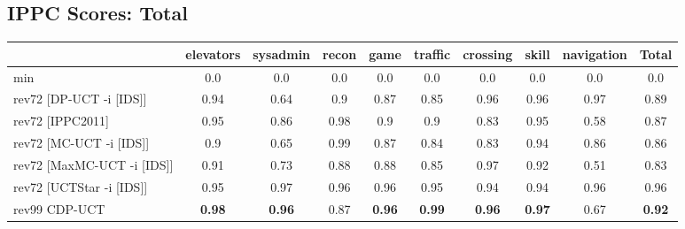 \documentclass{article}
\begin{document}
\bigskip

\subsection*{IPPC Scores: Total}

\begin{tabular}{|l|r@{$\pm$}rr@{$\pm$}rr@{$\pm$}rr@{$\pm$}rr@{$\pm$}rr@{$\pm$}rr@{$\pm$}rr@{$\pm$}rr@{$\pm$}r|}
\hline

& \multicolumn{2}{c}{elevators}
& \multicolumn{2}{c}{sysadmin}
& \multicolumn{2}{c}{recon}
& \multicolumn{2}{c}{game}
& \multicolumn{2}{c}{traffic}
& \multicolumn{2}{c}{crossing}
& \multicolumn{2}{c}{skill}
& \multicolumn{2}{c}{navigation}
& \multicolumn{2}{c|}{Total}
\\
\hline
\hline
min
& \multicolumn{2}{c}{0.0}
& \multicolumn{2}{c}{0.0}
& \multicolumn{2}{c}{0.0}
& \multicolumn{2}{c}{0.0}
& \multicolumn{2}{c}{0.0}
& \multicolumn{2}{c}{0.0}
& \multicolumn{2}{c}{0.0}
& \multicolumn{2}{c}{0.0}
& \multicolumn{2}{c|}{0.0}
\\
rev72 [DP-UCT -i [IDS]]
& \multicolumn{2}{c}{0.94}
& \multicolumn{2}{c}{0.64}
& \multicolumn{2}{c}{0.9}
& \multicolumn{2}{c}{0.87}
& \multicolumn{2}{c}{0.85}
& \multicolumn{2}{c}{0.96}
& \multicolumn{2}{c}{0.96}
& \multicolumn{2}{c}{0.97}
& \multicolumn{2}{c|}{0.89}
\\
rev72 [IPPC2011]
& \multicolumn{2}{c}{0.95}
& \multicolumn{2}{c}{0.86}
& \multicolumn{2}{c}{0.98}
& \multicolumn{2}{c}{0.9}
& \multicolumn{2}{c}{0.9}
& \multicolumn{2}{c}{0.83}
& \multicolumn{2}{c}{0.95}
& \multicolumn{2}{c}{0.58}
& \multicolumn{2}{c|}{0.87}
\\
rev72 [MC-UCT -i [IDS]]
& \multicolumn{2}{c}{0.9}
& \multicolumn{2}{c}{0.65}
& \multicolumn{2}{c}{0.99}
& \multicolumn{2}{c}{0.87}
& \multicolumn{2}{c}{0.84}
& \multicolumn{2}{c}{0.83}
& \multicolumn{2}{c}{0.94}
& \multicolumn{2}{c}{0.86}
& \multicolumn{2}{c|}{0.86}
\\
rev72 [MaxMC-UCT -i [IDS]]
& \multicolumn{2}{c}{0.91}
& \multicolumn{2}{c}{0.73}
& \multicolumn{2}{c}{0.88}
& \multicolumn{2}{c}{0.88}
& \multicolumn{2}{c}{0.85}
& \multicolumn{2}{c}{0.97}
& \multicolumn{2}{c}{0.92}
& \multicolumn{2}{c}{0.51}
& \multicolumn{2}{c|}{0.83}
\\
rev72 [UCTStar -i [IDS]]
& \multicolumn{2}{c}{0.95}
& \multicolumn{2}{c}{0.97}
& \multicolumn{2}{c}{0.96}
& \multicolumn{2}{c}{0.96}
& \multicolumn{2}{c}{0.95}
& \multicolumn{2}{c}{0.94}
& \multicolumn{2}{c}{0.94}
& \multicolumn{2}{c}{0.96}
& \multicolumn{2}{c|}{0.96}
\\
\hline
rev99 CDP-UCT
& \multicolumn{2}{c}{\textbf{0.98}}
& \multicolumn{2}{c}{\textbf{0.96}}
& \multicolumn{2}{c}{0.87}
& \multicolumn{2}{c}{\textbf{0.96}}
& \multicolumn{2}{c}{\textbf{0.99}}
& \multicolumn{2}{c}{\textbf{0.96}}
& \multicolumn{2}{c}{\textbf{0.97}}
& \multicolumn{2}{c}{0.67}
& \multicolumn{2}{c|}{\textbf{0.92}}
\\
\hline
\end{tabular}%

\bigskip
\end{document}
